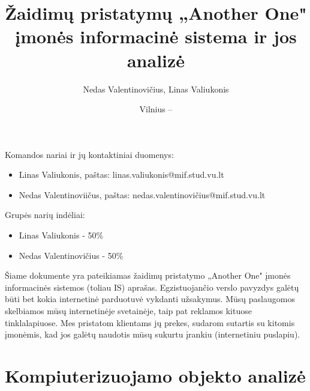 \documentclass{VUMIFPSkursinis}
\title{Žaidimų pristatymų „Another One" įmonės informacinė sistema ir jos analizė}
\author{Nedas Valentinovičius, Linas Valiukonis}
\date{Vilnius – \the\year}
\begin{document}
	
\maketitle
\cleardoublepage{}
\setcounter{page}{2}

Komandos nariai ir jų kontaktiniai duomenys:
\begin{itemize}
	\item Linas Valiukonis, paštas: linas.valiukonis@mif.stud.vu.lt
	\item Nedas Valentinoviičus, paštas: nedas.valentinovičius@mif.stud.vu.lt
\end{itemize}
Grupės narių indėliai:
\begin {itemize}
	\item Linas Valiukonis - 50\%
	\item Nedas Valentinovičius - 50\%
\end{itemize}

\tableofcontents

Šiame dokumente yra pateikiamas žaidimų pristatymo „Another One" įmonės informacinės sistemos (toliau IS) aprašas. Egzistuojančio verslo pavyzdys galėtų būti bet kokia internetinė parduotuvė vykdanti užsakymus. Mūsų paslaugomos skelbiamos mūsų internetinėje svetainėje, taip pat reklamos kituose tinklalapiuose. Mes pristatom klientams jų prekes, sudarom sutartis su kitomis įmonėmis, kad jos galėtų naudotis mūsų sukurtu įrankiu (internetiniu puslapiu).



\newpage
\section{Kompiuterizuojamo objekto analizė}
\end{document}
